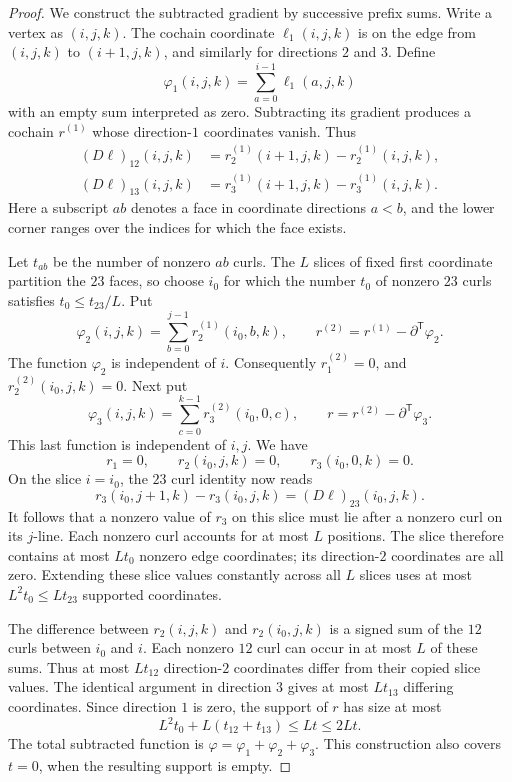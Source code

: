 \begin{proof}
We construct the subtracted gradient by successive prefix sums.
Write a vertex as $(i,j,k)$. The cochain coordinate $\ell_1(i,j,k)$ is
on the edge from $(i,j,k)$ to $(i+1,j,k)$, and similarly for directions
$2$ and $3$. Define
\[
 \varphi_1(i,j,k)=\sum_{a=0}^{i-1}\ell_1(a,j,k)
\]
with an empty sum interpreted as zero. Subtracting its gradient produces
a cochain $r^{(1)}$ whose direction-$1$ coordinates vanish. Thus
\begin{align*}
 (D\ell)_{12}(i,j,k)
   &=r^{(1)}_2(i+1,j,k)-r^{(1)}_2(i,j,k),\\
 (D\ell)_{13}(i,j,k)
   &=r^{(1)}_3(i+1,j,k)-r^{(1)}_3(i,j,k).
\end{align*}
Here a subscript $ab$ denotes a face in coordinate directions $a<b$,
and the lower corner ranges over the indices for which the face exists.

Let $t_{ab}$ be the number of nonzero $ab$ curls. The $L$ slices of fixed
first coordinate partition the $23$ faces, so choose $i_0$ for which the
number $t_0$ of nonzero $23$ curls satisfies $t_0\le t_{23}/L$. Put
\[
 \varphi_2(i,j,k)=\sum_{b=0}^{j-1}r^{(1)}_2(i_0,b,k),
 \qquad r^{(2)}=r^{(1)}-\partial^{\mathsf T}\varphi_2.
\]
The function $\varphi_2$ is independent of $i$. Consequently $r^{(2)}_1=0$,
and $r^{(2)}_2(i_0,j,k)=0$. Next put
\[
 \varphi_3(i,j,k)=\sum_{c=0}^{k-1}r^{(2)}_3(i_0,0,c),
 \qquad r=r^{(2)}-\partial^{\mathsf T}\varphi_3.
\]
This last function is independent of $i,j$. We have
\[
 r_1=0,\qquad r_2(i_0,j,k)=0,\qquad r_3(i_0,0,k)=0.
\]
On the slice $i=i_0$, the $23$ curl identity now reads
\[
 r_3(i_0,j+1,k)-r_3(i_0,j,k)=(D\ell)_{23}(i_0,j,k).
\]
It follows that a nonzero value of $r_3$ on this slice must lie after a
nonzero curl on its $j$-line. Each nonzero curl accounts for at most $L$
positions. The slice therefore contains at most $Lt_0$ nonzero edge
coordinates; its direction-$2$ coordinates are all zero. Extending these
slice values constantly across all $L$ slices uses at most
$L^2t_0\le Lt_{23}$ supported coordinates.

The difference between $r_2(i,j,k)$ and $r_2(i_0,j,k)$ is a signed sum of
the $12$ curls between $i_0$ and $i$. Each nonzero $12$ curl can occur in
at most $L$ of these sums. Thus at most $Lt_{12}$ direction-$2$ coordinates
differ from their copied slice values. The identical argument in direction
$3$ gives at most $Lt_{13}$ differing coordinates. Since direction $1$
is zero, the support of $r$ has size at most
\[
 L^2t_0+L(t_{12}+t_{13})\le Lt\le2Lt.
\]
The total subtracted function is
$\varphi=\varphi_1+\varphi_2+\varphi_3$. This construction also covers
$t=0$, when the resulting support is empty.
\end{proof}

